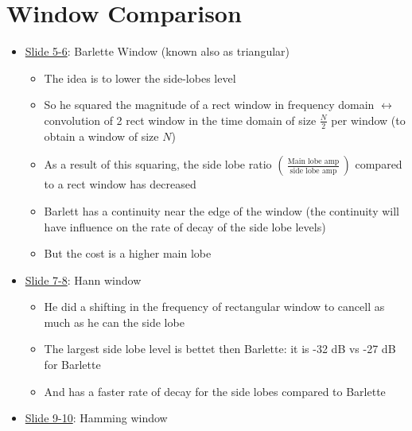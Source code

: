 \section{Window Comparison}

\begin{itemize}

\item \underline{Slide 5-6}: Barlette Window (known also as triangular)

\begin{itemize}
    \item The idea is to lower the side-lobes level
    
    
    \item So he squared the magnitude of a rect window in frequency domain $\leftrightarrow$ convolution of 2 rect window in the time domain of size $\displaystyle\frac{N}{2}$ per window (to obtain a window of size $N$)
    
    \item As a result of this squaring, the side lobe ratio $ \left( \, \displaystyle\frac{\text{Main lobe amp}}{\text{side lobe amp}} \, \right)$ compared to a rect window has decreased
    
    
    \item Barlett has a continuity near the edge of the window (the continuity will have influence on the rate of decay of the side lobe levels)
    
    
    \item But the cost is a higher main lobe
    
\end{itemize}

\item \underline{Slide 7-8}: Hann window

\begin{itemize}
    \item He did a shifting in the frequency of rectangular window to cancell as much as he can the side lobe
    
    \item The largest side lobe level is bettet then Barlette: it is -32 dB vs -27 dB for Barlette
    
    \item And has a faster rate of decay for the side lobes compared to Barlette
    
    
\end{itemize}


\item \underline{Slide 9-10}: Hamming window


\end{itemize}
